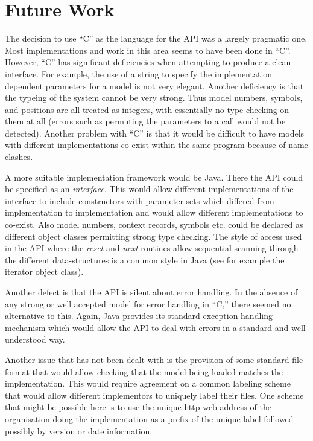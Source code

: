\documentclass[11pt]{article}
\begin{document}
\section{Future Work}

The decision to use ``C'' as the language for the API was a largely
pragmatic one. Most implementations and work in this area seems to
have been done in ``C''. However, ``C'' has significant deficiencies when
attempting to produce a clean interface. For example, the use of a
string to specify the implementation dependent parameters for a
model is not very elegant. Another deficiency is that the typeing of
the system cannot be very strong. Thus model numbers, symbols, and
positions are all treated as integers, with essentially no type
checking on them at all (errors such as permuting the parameters to a
call would not be detected). Another problem with ``C'' is that it
would be difficult to have models with different implementations
co-exist within the same program because of name clashes.

A more suitable implementation framework would be Java. There the API could
be specified as an \emph{interface}. This would allow different
implementations of the interface to include constructors with parameter
sets which differed from implementation to implementation and would allow
different implementations to co-exist. Also model numbers, context records,
symbols etc. could be declared as different object classes permitting
strong type checking. The style of access used in the API where the
\emph{reset} and \emph{next} routines allow sequential scanning through the
different data-structures is a common style in Java (see for example the
iterator object class).

Another defect is that the API is silent about error handling. In the
absence of any strong or well accepted model for error handling in ``C,'' there
seemed no alternative to this. Again, Java provides its standard exception
handling mechanism which would allow the API to deal with errors in a
standard and well understood way.

Another issue that has not been dealt with is the provision of some
standard file format that would allow checking that the model being
loaded matches the implementation. This would require agreement on a
common labeling scheme that would allow different implementors to
uniquely label their files. One scheme that might be possible here is
to use the unique http web address of the organisation doing the
implementation as a prefix of the unique label followed possibly by
version or date information.
\end{document}
